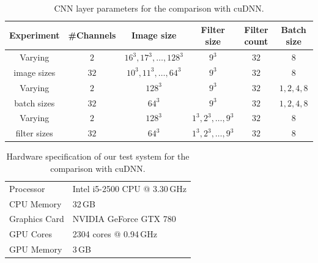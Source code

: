 \begin{table}
\centering
\caption{CNN layer parameters for the comparison with cuDNN.}
\label{tab:cudnn_parameters}
\begin{tabular}{cccccc}
\toprule
Experiment & \#Channels & Image size & Filter size & Filter count & Batch size
\\
\midrule
Varying & $2$  & $16^3, 17^3, \dotsc, 128^3$ & $9^3$ & $32$ & $8$ \\
image sizes & $32$ & $10^3, 11^3, \dotsc, 64^3$  & $9^3$ & $32$ & $8$ \\
\addlinespace
Varying & $2$  & $128^3$ & $9^3$ & $32$ & $1, 2, 4, 8$ \\
batch sizes & $32$ & $64^3$  & $9^3$ & $32$ & $1, 2, 4, 8$ \\
\addlinespace
Varying & $2$  & $128^3$ & $1^3, 2^3, \dotsc, 9^3$ & $32$ & $8$ \\
filter sizes & $32$ & $64^3$  & $1^3, 2^3, \dotsc, 9^3$ & $32$ & $8$ \\
\bottomrule
\end{tabular}
\end{table} 

\begin{table} 
\centering
\caption{Hardware specification of our test system for the comparison with
cuDNN.}
\label{tab:cudnn_hardware}
\begin{tabular} {ll}
\toprule
Processor & Intel i5-2500 CPU @ 3.30\,GHz \\
CPU Memory & 32\,GB \\
\addlinespace
Graphics Card & NVIDIA GeForce GTX 780 \\
GPU Cores & 2304 cores @ 0.94\,GHz \\
GPU Memory & 3\,GB \\
\bottomrule
\end{tabular}
\end{table}

